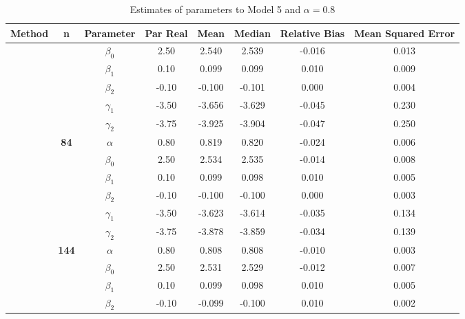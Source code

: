 \begin{table}[h]

\caption{\label{tab:Est_model_5_Alpha0.8}Estimates of parameters to Model 5 and $\alpha=0.8$}
\centering
\begin{tabular}[t]{>{}c>{}ccccccc}
\toprule
Method & n & Parameter & Par Real & Mean & Median & Relative Bias & Mean Squared Error\\
\midrule
 &  & $\beta_0$ & 2.50 & 2.540 & 2.539 & -0.016 & 0.013\\

 &  & $\beta_1$ & 0.10 & 0.099 & 0.099 & 0.010 & 0.009\\

 &  & $\beta_2$ & -0.10 & -0.100 & -0.101 & 0.000 & 0.004\\

 &  & $\gamma_1$ & -3.50 & -3.656 & -3.629 & -0.045 & 0.230\\

 &  & $\gamma_2$ & -3.75 & -3.925 & -3.904 & -0.047 & 0.250\\

 & \multirow{-6}{*}{\centering\arraybackslash \textbf{84}} & $\alpha$ & 0.80 & 0.819 & 0.820 & -0.024 & 0.006\\

 &  & $\beta_0$ & 2.50 & 2.534 & 2.535 & -0.014 & 0.008\\

 &  & $\beta_1$ & 0.10 & 0.099 & 0.098 & 0.010 & 0.005\\

 &  & $\beta_2$ & -0.10 & -0.100 & -0.100 & 0.000 & 0.003\\

 &  & $\gamma_1$ & -3.50 & -3.623 & -3.614 & -0.035 & 0.134\\

 &  & $\gamma_2$ & -3.75 & -3.878 & -3.859 & -0.034 & 0.139\\

 & \multirow{-6}{*}{\centering\arraybackslash \textbf{144}} & $\alpha$ & 0.80 & 0.808 & 0.808 & -0.010 & 0.003\\

 &  & $\beta_0$ & 2.50 & 2.531 & 2.529 & -0.012 & 0.007\\

 &  & $\beta_1$ & 0.10 & 0.099 & 0.098 & 0.010 & 0.005\\

 &  & $\beta_2$ & -0.10 & -0.099 & -0.100 & 0.010 & 0.002\\


\end{tabular}
\end{table}
